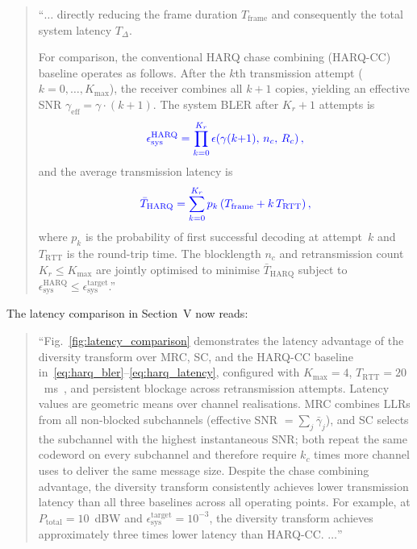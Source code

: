 \begin{quote}
``$\ldots$ directly reducing the frame duration $T_{\mathrm{frame}}$ and
consequently the total system latency $T_{\Delta}$.

{\color{blue}For comparison, the conventional HARQ chase combining
(HARQ-CC) baseline operates as follows. After the $k$th
transmission attempt ($k = 0,\ldots,K_{\max}$), the receiver
combines all $k+1$ copies, yielding an effective SNR
$\gamma_{\mathrm{eff}} = \gamma \cdot (k+1)$.
The system BLER after $K_r+1$ attempts is}
\begin{equation*}
\color{blue}
\epsilon_{\mathrm{sys}}^{\mathrm{HARQ}} =
\prod_{k=0}^{K_r} \epsilon\!\left(\gamma(k{+}1),\, n_c,\, R_c\right),
\end{equation*}
{\color{blue}and the average transmission latency is}
\begin{equation*}
\color{blue}
\bar{T}_{\mathrm{HARQ}} = \sum_{k=0}^{K_r} p_k
\left(T_{\mathrm{frame}} + k\,T_{\mathrm{RTT}}\right),
\end{equation*}
{\color{blue}where $p_k$ is the probability of first successful decoding at
attempt~$k$ and $T_{\mathrm{RTT}}$ is the round-trip time.
The blocklength $n_c$ and retransmission count
$K_r \leq K_{\max}$ are jointly optimised to minimise
$\bar{T}_{\mathrm{HARQ}}$ subject to
$\epsilon_{\mathrm{sys}}^{\mathrm{HARQ}} \leq
\epsilon_{\mathrm{sys}}^{\mathrm{target}}$.}''
\end{quote}

The latency comparison in Section~V now reads:

\begin{quote}
``Fig.~\ref{fig:latency_comparison} demonstrates the latency advantage
of the diversity transform over {\color{blue}MRC, SC, and} the HARQ-CC baseline
in~\eqref{eq:harq_bler}--\eqref{eq:harq_latency}{\color{blue},
configured with $K_{\max} = 4$,
$T_{\mathrm{RTT}} = 20$~ms~\cite{3GPP38821}, and persistent
blockage across retransmission attempts.
Latency values are geometric means over channel realisations.
MRC combines LLRs from all non-blocked subchannels (effective SNR $= \sum_j \bar{\gamma}_j$), and SC selects the subchannel with the highest instantaneous SNR; both repeat the same codeword on every subchannel and therefore require $k_c$ times more channel uses to deliver the same message size.}
Despite the chase combining advantage, the diversity transform consistently achieves
lower transmission latency than {\color{blue}all three baselines} across all operating points.
{\color{blue}For example, at $P_{\mathrm{total}} = 10$~dBW and $\epsilon_{\mathrm{sys}}^{\mathrm{target}} = 10^{-3}$, the diversity transform achieves approximately three times lower latency than HARQ-CC.} $\ldots$''
\end{quote}

